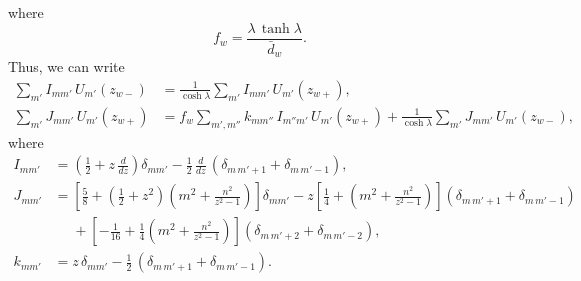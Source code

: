 \documentclass[12pt,prb,aps,notitlepage]{revtex4-1}
\begin{document}
where
\begin{equation}
f_w= \frac{\lambda\,\tanh\lambda}{\bar{d}_w}.
\end{equation}
Thus, we can write
\begin{align}
\sum_{m'}I_{mm'}\,U_{m'}(z_{w-}) &= \frac{1}{\cosh\lambda}\sum_{m'}I_{mm'}\,U_{m'}(z_{w+}),\\[0.5ex]
\sum_{m'}J_{mm'}\,U_{m'}(z_{w+})&= f_w\sum_{m',m''}k_{mm''}\,I_{m''m'}\,U_{m'}(z_{w+}) + \frac{1}{\cosh\lambda}\sum_{m'}J_{mm'}\,U_{m'}(z_{w-}),
\end{align}
where
\begin{align}
I_{mm'}&= \left(\frac{1}{2}+z\,\frac{d}{dz}\right)\delta_{mm'}-\frac{1}{2}\,\frac{d}{dz}\,(\delta_{m\,m'+1}+\delta_{m\,m'-1}),\\[0.5ex]
J_{mm'}&= \left[\frac{5}{8} + \left(\frac{1}{2}+z^2\right)\left(m^2+\frac{n^2}{z^2-1}\right)\right]\delta_{mm'}
-z\left[\frac{1}{4}+ \left(m^2+\frac{n^2}{z^2-1}\right)\right](\delta_{m\,m'+1}+\delta_{m\,m'-1})\nonumber\\[0.5ex]
&\phantom{=}+\left[-\frac{1}{16}+\frac{1}{4} \left(m^2+\frac{n^2}{z^2-1}\right)\right](\delta_{m\,m'+2}+\delta_{m\,m'-2}),\\[0.5ex]
k_{mm'} &= z\,\delta_{mm'} - \frac{1}{2}\,(\delta_{m\,m'+1}+\delta_{m\,m'-1}).
\end{align}
\end{document}
